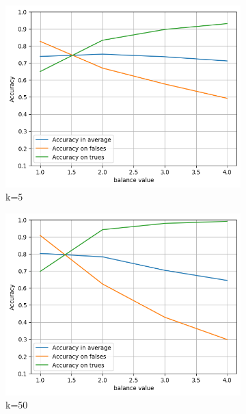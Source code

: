 \documentclass{article}
\begin{document}
\begin{figure}[htbp]
  \centering
  \begin{subfigure}[t]{0.33\textwidth}
    \centering
    \includegraphics[width=\linewidth]{balancek5.png}
    \caption{k=5}
  \end{subfigure}%
  \hfill
  \begin{subfigure}[t]{0.33\textwidth}
    \centering
    \includegraphics[width=\linewidth]{balancek50.png}
    \caption{k=50}
  \end{subfigure}
  \hfill
  \begin{subfigure}[t]{0.33\textwidth}
    \centering

\end{subfigure}
\end{figure}
\end{document}
